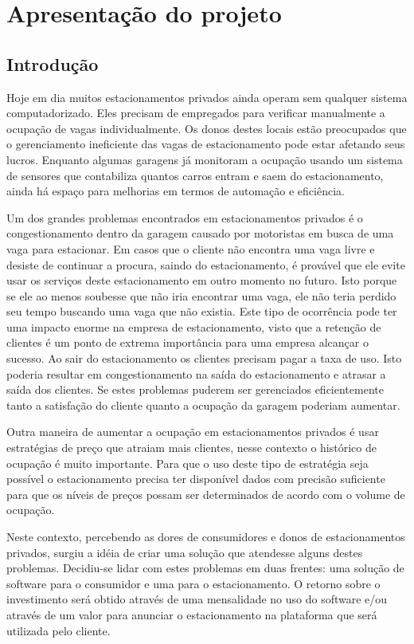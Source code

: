 \part{Apresentação do projeto}

\chapter[Introdução]{Introdução}

Hoje em dia muitos estacionamentos privados ainda operam sem qualquer sistema computadorizado. Eles precisam de empregados para verificar manualmente a ocupação de vagas individualmente. Os donos destes locais estão preocupados que o gerenciamento ineficiente das vagas de estacionamento pode estar afetando seus lucros. Enquanto algumas garagens já monitoram a ocupação usando um sistema de sensores que contabiliza quantos carros entram e saem do estacionamento, ainda há espaço para melhorias em termos de automação e eficiência.

Um dos grandes problemas encontrados em estacionamentos privados é o congestionamento dentro da garagem causado por motoristas em busca de uma vaga para estacionar. Em casos que o cliente não encontra uma vaga livre e desiste de continuar a procura, saindo do estacionamento, é provável que ele evite usar os serviços deste estacionamento em outro momento no futuro. Isto porque se ele ao menos soubesse que não iria encontrar uma vaga, ele não teria perdido seu tempo buscando uma vaga que não existia. Este tipo de ocorrência pode ter uma impacto enorme na empresa de estacionamento, visto que a retenção de clientes é um ponto de extrema importância para uma empresa alcançar o sucesso. Ao sair do estacionamento os clientes precisam pagar a taxa de uso. Isto poderia resultar em congestionamento na saída do estacionamento e atrasar a saída dos clientes. Se estes problemas puderem ser gerenciados eficientemente tanto a satisfação do cliente quanto a ocupação da garagem poderiam aumentar.

Outra maneira de aumentar a ocupação em estacionamentos privados é usar estratégias de preço que atraiam mais clientes, nesse contexto o histórico de ocupação é muito importante. Para que o uso deste tipo de estratégia seja possível o estacionamento precisa ter disponível dados com precisão suficiente para que os níveis de preços possam ser determinados de acordo com o volume de ocupação.

Neste contexto, percebendo as dores de consumidores e donos de estacionamentos privados, surgiu a idéia de criar uma solução que atendesse alguns destes problemas. Decidiu-se lidar com estes problemas em duas frentes: uma solução de software para o consumidor e uma para o estacionamento. O retorno sobre o investimento será obtido através de uma mensalidade no uso do software e/ou através de um valor para anunciar o estacionamento na plataforma que será utilizada pelo cliente.

